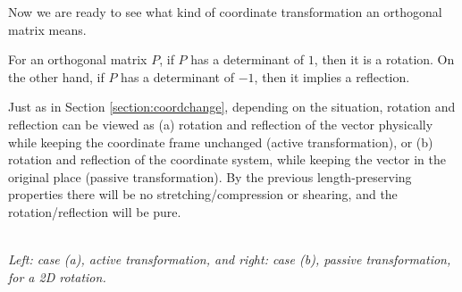 Now we are ready to see what kind of coordinate transformation an orthogonal matrix means.
\begin{thm}
\label{thm:orthodet}
For an orthogonal matrix $P$, if $P$ has a determinant of $1$, then it is a rotation. On the other hand, if $P$ has a determinant of $-1$, then it implies a reflection.
\end{thm}
Just as in Section \ref{section:coordchange}, depending on the situation, rotation and reflection can be viewed as (a) rotation and reflection of the vector physically while keeping the coordinate frame unchanged (active transformation), or (b) rotation and reflection of the coordinate system, while keeping the vector in the original place (passive transformation). By the previous length-preserving properties there will be no stretching/compression or shearing, and the rotation/reflection will be pure.

\begin{center}
\\
\textit{Left: case (a), active transformation, and right: case (b), passive transformation, for a 2D rotation.} 
\end{center}

